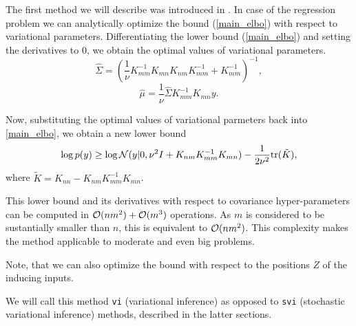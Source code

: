 The first method we will describe was introduced in \cite{Titsias}. In case of the regression problem we can analytically optimize the bound (\ref{main_elbo}) with respect to variational parameters. Differentiating the lower bound (\ref{main_elbo}) and setting the derivatives to $0$,  we obtain the optimal values of variational parameters.
$$\hat \Sigma = \left(\frac 1 {\nu} K_{mm}^{-1} K_{mn} K_{nm} K_{mm}^{-1} + K_{mm}^{-1} \right)^{-1},$$
$$\hat \mu = \frac 1 {\nu} \hat \Sigma K_{mm}^{-1} K_{mn} y.$$

Now, substituting the optimal values of variational parmeters back into \ref{main_elbo}, we obtain a new lower bound
\begin{equation}\label{titsias_elbo}
	\log p(y) \ge \log \mathcal{N}(y|0, \nu^2 I + K_{nm} K_{mm}^{-1} K_{mn}) - \frac 1 {2\nu^2} \mbox{tr}(\tilde K),
\end{equation}
where $\tilde K = K_{nn} - K_{nm} K_{mm}^{-1} K_{mn}$.

This lower bound and its derivatives with respect to covariance hyper-parameters can be computed in $\mathcal{O}(nm^2) + \mathcal{O}(m^3)$ operations. As $m$ is considered to be sustantially smaller than $n$, this is equivalent to $\mathcal{O}(nm^2)$. This complexity makes the method applicable to moderate and even big problems.

Note, that we can also optimize the bound with respect to the positions $Z$ of the inducing inputs.

We will call this method \lstinline{vi} (variational inference) as opposed to \lstinline{svi} (stochastic variational inference) methods, described in the latter sections.